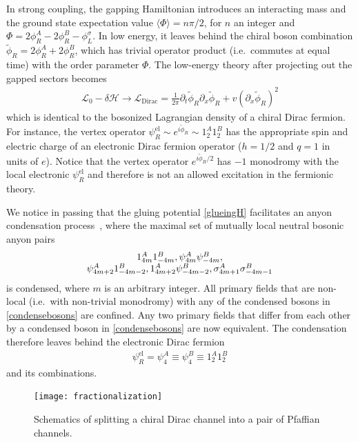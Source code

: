In strong coupling, the gapping Hamiltonian introduces an interacting mass and the ground state expectation value $\langle\Phi\rangle=n\pi/2$, for $n$ an integer and $\Phi=2\phi^A_R-2\phi^B_R-\phi^\sigma_L$. In low energy, it leaves behind the chiral boson combination $\tilde\phi_R=2\phi_R^A+2\phi_R^B$, which has trivial operator product (i.e.~commutes at equal time) with the order parameter $\Phi$. The low-energy theory after projecting out the gapped sectors becomes \begin{align}\mathcal{L}_0-\delta\mathcal{H}\longrightarrow\mathcal{L}_{\mathrm{Dirac}}=\frac{1}{2\pi}\partial_t\tilde\phi_R\partial_x\tilde\phi_R+v(\partial_x\tilde\phi_R)^2\end{align} which is identical to the bosonized Lagrangian density of a chiral Dirac fermion. For instance, the vertex operator $\psi_R^{\mathrm{el}}\sim e^{i\tilde\phi_R}\sim 1_2^A1_2^B$ has the appropriate spin and electric charge of an electronic Dirac fermion operator ($h=1/2$ and $q=1$ in units of $e$). Notice that the vertex operator $e^{i\tilde\phi_R/2}$ has $-1$ monodromy with the local electronic $\psi_R^{\mathrm{el}}$ and therefore is not an allowed excitation in the fermionic theory.

We notice in passing that the gluing potential \eqref{glueingH} facilitates an anyon condensation process~\cite{BaisSlingerlandCondensation}, where the maximal set of mutually local neutral bosonic anyon pairs \begin{align}\begin{array}{*{20}c}1_{4m}^A1_{-4m}^B,\psi_{4m}^A\psi_{-4m}^B,\\\psi_{4m+2}^A1_{-4m-2}^B,1_{4m+2}^A\psi_{-4m-2}^B,\sigma_{4m+1}^A\sigma_{-4m-1}^B\end{array}\label{condensebosons}\end{align} is condensed, where $m$ is an arbitrary integer. All primary fields that are non-local (i.e.~with non-trivial monodromy) with any of the condensed bosons in \eqref{condensebosons} are confined. Any two primary fields that differ from each other by a condensed boson in \eqref{condensebosons} are now equivalent. The condensation therefore leaves behind the electronic Dirac fermion \begin{align}\psi^{\mathrm{el}}_R=\psi^A_4\equiv\psi^B_4\equiv1_2^A1_2^B\end{align} and its combinations. 

\begin{figure}[htbp]
	\centering\texttt{[image: fractionalization]}
	\caption{Schematics of splitting a chiral Dirac channel into a pair of Pfaffian channels.}\label{fig:fractionalization}
\end{figure}

